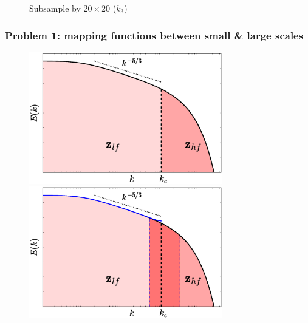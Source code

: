 \documentclass{beamer}
\begin{document}
\begin{frame}
\begin{figure}
\begin{overprint}
			\caption*{Subsample by $ 20 \times 20 $ ($ k_3 $)}
		\end{overprint}				
	\end{figure} 		
\end{frame}

\begin{frame}
\frametitle{Problem 1: mapping functions between small \& large scales}

	\begin{figure}
		\begin{overprint}
			\centerline{\includegraphics[width=0.75\textwidth]{./figures/turbulence/turbulence_spectra_long}}
			\centerline{\includegraphics[width=0.75\textwidth]{./figures/turbulence/turbulence_spectra_long_alias}}			
		\end{overprint}	
	\end{figure}
\end{frame}
\end{document}
